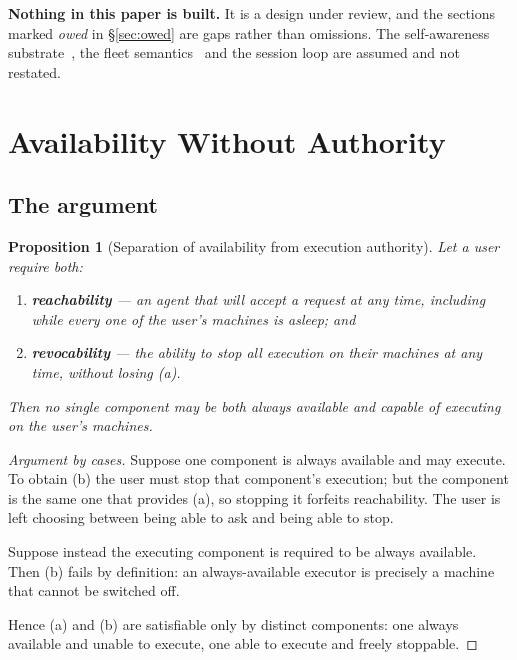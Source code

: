 \documentclass[11pt]{article}
\newtheorem{proposition}{Proposition}
\begin{document}
\textbf{Nothing in this paper is built.} It is a design under review, and the sections marked \emph{owed} in \S\ref{sec:owed} are gaps rather than omissions. The self-awareness substrate~\citep{yang2026v2corrected,yang2026history}, the fleet semantics~\citep{yang2026hierarchical,yang2026manager} and the session loop are assumed and not restated.

\section{Availability Without Authority}
\label{sec:separation}

\subsection{The argument}

\begin{proposition}[Separation of availability from execution authority]
\label{prop:separation}
Let a user require both:
\begin{enumerate}[label=(\alph*)]
\item \textbf{reachability} --- an agent that will accept a request at any time, including while every one of the user's machines is asleep; and
\item \textbf{revocability} --- the ability to stop all execution on their machines at any time, without losing (a).
\end{enumerate}
Then no single component may be both always available and capable of executing on the user's machines.
\end{proposition}

\begin{proof}[Argument by cases]
Suppose one component is always available and may execute. To obtain (b) the user must stop that component's execution; but the component is the same one that provides (a), so stopping it forfeits reachability. The user is left choosing between being able to ask and being able to stop.

Suppose instead the executing component is required to be always available. Then (b) fails by definition: an always-available executor is precisely a machine that cannot be switched off.

Hence (a) and (b) are satisfiable only by distinct components: one always available and unable to execute, one able to execute and freely stoppable.
\end{proof}
\end{document}
